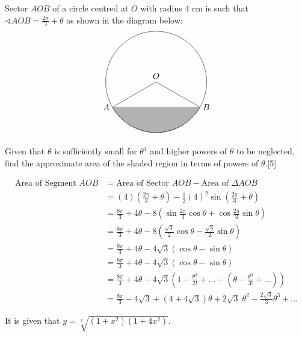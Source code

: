 \documentclass[12pt, a4 paper]{article}
\begin{document}
\begin{outline}[enumerate]
 \1 Sector \(AOB\) of a circle centred at \(O\) with radius 4 cm is such that \(\sphericalangle AOB = \frac{2\pi}{3}+\theta \) as shown in the diagram below: %
 \[
  \begin{tikzpicture}
   \draw (0,0) node[above]{\(O\)} circle (60pt);
   \draw (-51.96152pt,-30pt) node[left]{\(A\)} -- (0,0);
   \draw (51.96152pt,-30pt) node[right]{\(B\)} -- (0,0);
   \filldraw[color=white!70!black,draw=black] (-51.96152pt,-30pt) arc (210:330:60pt);
   \draw[dotted](-51.96152pt,-30pt) -- (51.96152pt,-30pt);
  \end{tikzpicture}
 \]
 Given that \(\theta \) is sufficiently small for \(\theta^4\) and higher powers of \(\theta \) to be neglected, find the approximate area of the shaded region in terms of powers of \(\theta \).\hfill[5]
 \begin{answer}
   \begin{align*}
     \textrm{Area of Segment $AOB$} &= \textrm{Area of Sector $AOB$} -\textrm{Area of $\Delta AOB$} \\
     &= (4)\left(\frac{2\pi}{3}+\theta \right) - \frac{1}{2}(4)^2 \sin {\left(\frac{2\pi}{3}+\theta\right)} \\
     &= \frac{8\pi}{3}+4\theta - 8\left(\sin{\frac{2\pi}{3}}\cos{\theta}+\cos{\frac{2\pi}{3}}\sin{\theta}\right) \\
     &= \frac{8\pi}{3}+4\theta - 8\left({\frac{\sqrt{3}}{2}}\cos{\theta}-\frac{\sqrt{3}}{2}\sin{\theta}\right) \\
     &= \frac{8\pi}{3}+4\theta - 4\sqrt{3}(\cos{\theta}-\sin{\theta}) \\
     &= \frac{8\pi}{3}+4\theta - 4\sqrt{3}(\cos{\theta}-\sin{\theta}) \\
     &= \frac{8\pi}{3}+4\theta - 4\sqrt{3}\left(1-\frac{\theta^2}{2!} + \dots - \left(\theta-\frac{\theta^3}{3!} + \dots\right)\right) \\
     &= \frac{8\pi}{3}-4\sqrt{3}+(4+4\sqrt{3})\theta + 2\sqrt{3}\;\theta^2-\frac{2\sqrt{3}}{3}\theta^3+\dots
   \end{align*}
 \end{answer}
 \1 It is given that \(y=\sqrt[3]{(1+x^2)(1+4x^2)}\). %


\end{outline}
\end{document}
